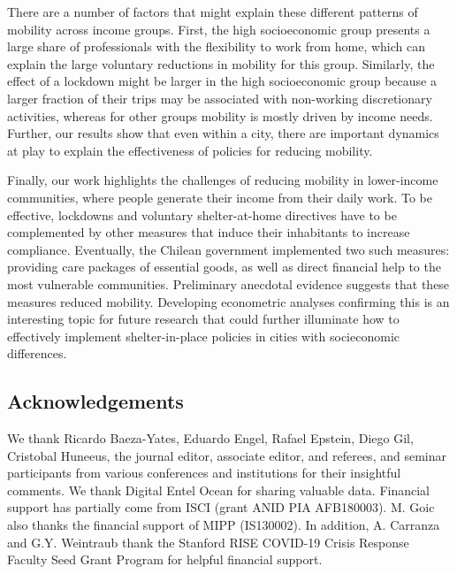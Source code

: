 There are a number of factors that might explain these different patterns of mobility across income groups. First, the high socioeconomic group presents a large share of professionals with the flexibility to work from home,  which can explain the large voluntary reductions in mobility for this group. Similarly, the effect of a lockdown might be larger in the high socioeconomic group because a larger fraction of their trips may be associated with non-working discretionary activities, whereas for other groups mobility is mostly driven by income needs. Further, our results show that even within a city, there are important dynamics at play to explain the effectiveness of policies for reducing mobility. %

Finally, our work highlights the challenges of reducing mobility in lower-income communities, where people generate their income from their daily work. To be effective, lockdowns and voluntary shelter-at-home directives have to be complemented by other measures that induce their inhabitants to increase compliance. Eventually, the Chilean government implemented two such measures: providing care packages of essential goods, as well as direct financial help to the most vulnerable communities. Preliminary anecdotal evidence suggests that these measures reduced mobility. Developing econometric analyses confirming this is an interesting topic for future research that could further illuminate how to effectively implement shelter-in-place policies in cities with socieconomic differences.

\subsection*{Acknowledgements}
We thank Ricardo Baeza-Yates, Eduardo Engel, Rafael Epstein, Diego Gil, Cristobal Huneeus, the journal editor, associate editor, and referees, and seminar participants from various conferences and institutions for their insightful comments. We thank Digital Entel Ocean for sharing valuable data. Financial support has partially come from ISCI (grant ANID PIA AFB180003). M. Goic also thanks the financial support of MIPP (IS130002). In addition, A. Carranza and G.Y. Weintraub thank the  Stanford RISE COVID-19 Crisis Response Faculty Seed Grant Program for helpful financial support.

